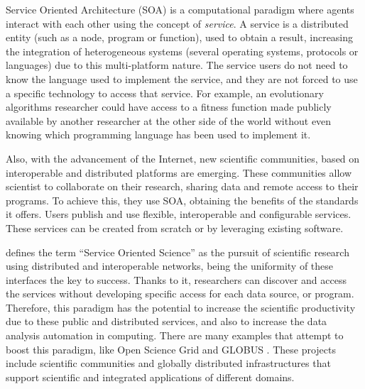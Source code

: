 Service Oriented Architecture (SOA) is a computational
paradigm where agents %
interact with each other using the concept of
{\em service}. A service is a distributed entity (such as a node, program or
function), used to obtain a result, increasing the integration of heterogeneous
systems (several operating systems, protocols or languages) due to
this multi-platform nature. The service users do not need to know
the language used to implement the service, and they are not
forced to use a specific technology to access that service. For
example, an evolutionary algorithms researcher could have access to a
fitness function made publicly available by another researcher at the
other side of the world without even knowing which programming language
has been used to implement it. %

Also, with the advancement of the Internet, new scientific
communities, based on interoperable and distributed platforms are
emerging. These communities allow scientist to collaborate on their
research, sharing data and remote access to their programs. To achieve
this, they use SOA, obtaining the benefits of the standards it
offers. Users publish and use flexible, interoperable and configurable
services. These services can be created from scratch or by leveraging
existing software. %

 \cite{Foster2005Science} defines the term ``Service Oriented
Science'' as the pursuit of scientific research using distributed and
interoperable networks, being the uniformity of
these interfaces the key to success. Thanks to it, researchers can discover and access
the services without developing specific access for each data source, or
program. %
Therefore, this paradigm has the potential to increase the
scientific productivity due to these public and distributed services,
and also to increase the data analysis automation in computing. There
are many examples that attempt to boost this paradigm, like Open
Science Grid \cite{Altunay2011OpenScience} and GLOBUS
\cite{Foster2005Globus}.  %
These projects include scientific communities and globally distributed infrastructures that support scientific and integrated applications of different domains.

